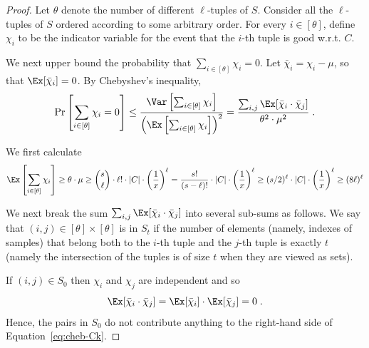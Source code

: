 \begin{proof}
Let $\theta$ denote the number of different $\ell$-tuples of $S$.
Consider all the $\ell$-tuples of $S$ ordered according to some arbitrary order. 
For every $i\in [\theta]$, define $\chi_i$ to be the indicator variable for the event that the $i$-th tuple is good w.r.t. $C$.

We next upper bound the probability that
$\sum_{i \in [\theta]} \chi_{i}=0$.
Let $\bar{\chi}_{i} = \chi_{i} - \mu$, so that $\Ex[\bar{\chi}_{i}] = 0$.
By Chebyshev's inequality,
\begin{equation}\label{eq:cheb-Ck}
\Pr\left[\sum_{i\in [\theta]}\chi_{i}=0\right] \leq \frac{\Var\left[\sum_{i\in [\theta]}\chi_{i}\right]}{\left(\Ex\left[\sum_{i\in [\theta]}\chi_{i}\right]\right)^2}
= \frac{\sum_{i,j} \Ex[\bar{\chi}_{i}\cdot \bar{\chi}_{j}]}{\theta^2\cdot \mu^2} \;.
\end{equation}

We first calculate 
\begin{equation}
\Ex\left[\sum_{i\in [\theta]}\chi_{i}\right] \geq \theta \cdot \mu \geq {s \choose \ell } \cdot \ell! \cdot |C| \cdot \left(\frac{1}{x}\right)^{\ell} 
= \frac{s!}{(s-\ell)!} \cdot |C| \cdot \left(\frac{1}{x}\right)^{\ell} \geq (s/2)^\ell \cdot |C| \cdot \left(\frac{1}{x}\right)^{\ell}  \geq (8\ell)^\ell 
\end{equation}

We next break the sum $\sum_{i,j} \Ex[\bar{\chi}_{i}\cdot \bar{\chi}_{j}]$ into several sub-sums as follows.
We say that $(i,j) \in [\theta]\times [\theta]$ is in $S_t$ if the number of elements (namely, indexes of samples) that belong both to the $i$-th tuple and the $j$-th tuple is exactly $t$ (namely the intersection of the tuples is of size $t$ when they are viewed as sets).  

If $(i,j) \in S_0$ then $\chi_{i}$ and $\chi_{j}$ are independent and so
\begin{equation}\label{eq:cheb-case1}
\Ex[\bar{\chi}_{i}\cdot \bar{\chi}_{j}] =  \Ex[\bar{\chi}_{i}]\cdot \Ex[\bar{\chi}_{j}] = 0\;.
\end{equation}
Hence, the pairs in $S_0$ do not contribute anything to the right-hand side of Equation~\eqref{eq:cheb-Ck}.



\end{proof}
